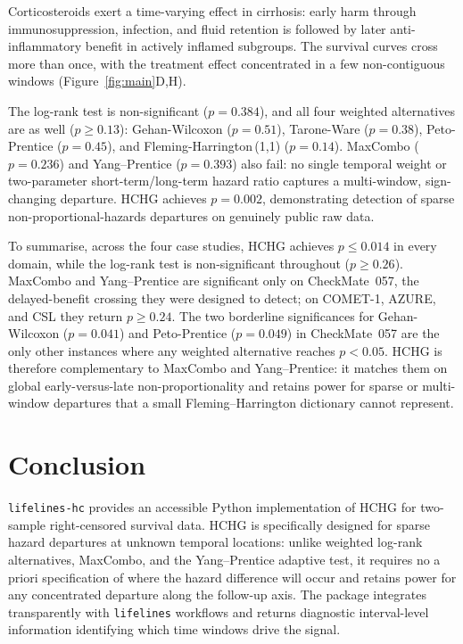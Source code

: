 \documentclass[11pt]{article}
\begin{document}
Corticosteroids exert a time-varying effect in cirrhosis: early harm through
immunosuppression, infection, and fluid retention is followed by later
anti-inflammatory benefit in actively inflamed subgroups. The survival
curves cross more than once, with the treatment effect concentrated in a
few non-contiguous windows (Figure~\ref{fig:main}D,H).

The log-rank test is non-significant ($p = 0.384$), and all four weighted
alternatives are as well ($p \geq 0.13$): Gehan-Wilcoxon ($p = 0.51$),
Tarone-Ware ($p = 0.38$), Peto-Prentice ($p = 0.45$), and
Fleming-Harrington\,(1,1) ($p = 0.14$). MaxCombo ($p = 0.236$) and
Yang--Prentice ($p = 0.393$) also fail: no single temporal weight or
two-parameter short-term/long-term hazard ratio captures a multi-window,
sign-changing departure. HCHG achieves
$p = 0.002$, demonstrating detection of sparse non-proportional-hazards departures on genuinely public raw data.

To summarise, across the four case studies, HCHG achieves $p \leq 0.014$ in every domain,
while the log-rank test is non-significant throughout ($p \geq 0.26$). MaxCombo and Yang--Prentice are significant only on CheckMate~057, the delayed-benefit crossing they were designed to detect; on COMET-1, AZURE, and CSL they return $p \geq 0.24$. The
two borderline significances for Gehan-Wilcoxon ($p = 0.041$) and
Peto-Prentice ($p = 0.049$) in CheckMate~057 are the only other instances where
any weighted alternative reaches $p < 0.05$. HCHG is therefore complementary to MaxCombo and Yang--Prentice: it matches them on global early-versus-late non-proportionality and retains power for sparse or multi-window departures that a small Fleming--Harrington dictionary cannot represent. 


\section{Conclusion}

\texttt{lifelines-hc} provides an accessible Python implementation of
HCHG for two-sample right-censored survival data. HCHG is specifically
designed for sparse hazard departures at unknown temporal locations:
unlike weighted log-rank alternatives, MaxCombo, and the Yang--Prentice
adaptive test, it requires no a priori
specification of where the hazard difference will occur and retains
power for any concentrated departure along the follow-up axis. The
package integrates transparently with \texttt{lifelines} workflows and
returns diagnostic interval-level information identifying which time
windows drive the signal.
\end{document}
